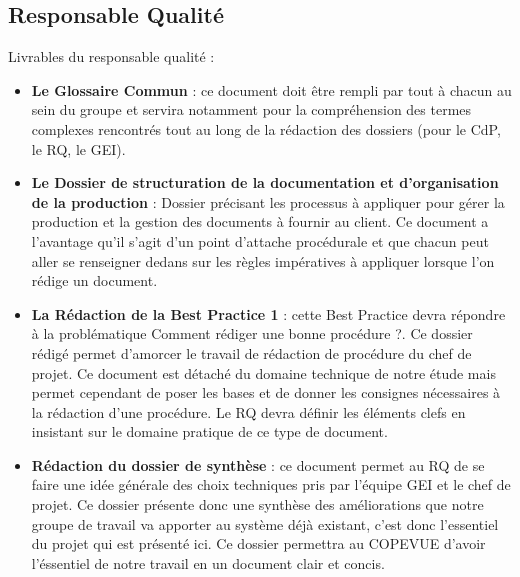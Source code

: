     \subsection{Responsable Qualité}
Livrables du responsable qualité :   
\begin{itemize}
\item \textbf{Le Glossaire Commun} : ce document doit être rempli par tout à chacun au sein du groupe et servira notamment pour la compréhension des termes complexes rencontrés tout au long de la rédaction des dossiers (pour le CdP, le RQ, le GEI).
\item \textbf{Le Dossier de structuration de la documentation et d'organisation de la production} : Dossier précisant les processus à appliquer pour gérer la production et la gestion des documents à fournir au client. Ce document a l'avantage qu'il s'agit d'un point d'attache procédurale et que chacun peut aller se renseigner dedans sur les règles impératives à appliquer lorsque l'on rédige un document.
\item \textbf{La Rédaction de la Best Practice 1} : cette Best Practice devra répondre à la problématique \og Comment rédiger une bonne procédure ?\fg. Ce dossier rédigé permet d'amorcer le travail de rédaction de procédure du chef de projet. Ce document est détaché du domaine technique de notre étude mais permet cependant de poser les bases et de donner les consignes nécessaires à la rédaction d'une procédure. Le RQ devra définir les éléments clefs en insistant sur le domaine pratique de ce type de document.
\item \textbf{Rédaction du dossier de synthèse} : ce document permet au RQ de se faire une idée générale des choix techniques pris par l'équipe GEI et le chef de projet. Ce dossier présente donc une synthèse des améliorations que notre groupe de travail va apporter au système déjà existant, c'est donc l'essentiel du projet qui est présenté ici. Ce dossier permettra au COPEVUE d'avoir l'éssentiel de notre travail en un document clair et concis.
\end{itemize}

